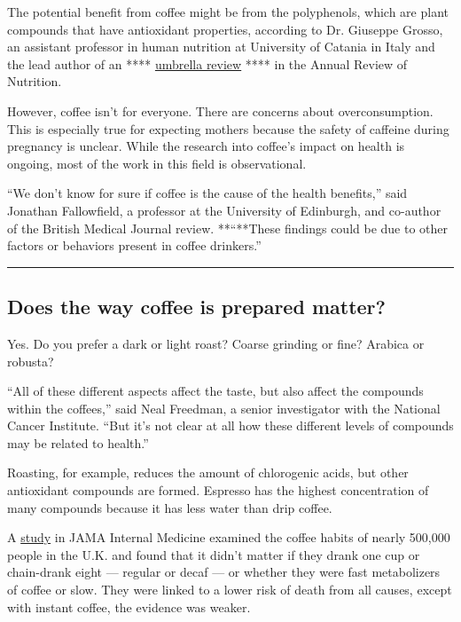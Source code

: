 The potential benefit from coffee might be from the polyphenols, which
are plant compounds that have antioxidant properties, according to Dr.
Giuseppe Grosso, an assistant professor in human nutrition at University
of Catania in Italy and the lead author of an ****
\href{https://www.annualreviews.org/doi/10.1146/annurev-nutr-071816-064941}{umbrella
review} **** in the Annual Review of Nutrition.

However, coffee isn't for everyone. There are concerns about
overconsumption. This is especially true for expecting mothers because
the safety of caffeine during pregnancy is unclear. While the research
into coffee's impact on health is ongoing, most of the work in this
field is observational.

``We don't know for sure if coffee is the cause of the health
benefits,'' said Jonathan Fallowfield, a professor at the University of
Edinburgh, and co-author of the British Medical Journal review.
**``**These findings could be due to other factors or behaviors present
in coffee drinkers.''

\begin{center}\rule{0.5\linewidth}{\linethickness}\end{center}

\hypertarget{does-the-way-coffee-is-prepared-matter}{%
\subsection{Does the way coffee is prepared
matter?}\label{does-the-way-coffee-is-prepared-matter}}

Yes. Do you prefer a dark or light roast? Coarse grinding or fine?
Arabica or robusta?

``All of these different aspects affect the taste, but also affect the
compounds within the coffees,'' said Neal Freedman, a senior
investigator with the National Cancer Institute. ``But it's not clear at
all how these different levels of compounds may be related to health.''

Roasting, for example, reduces the amount of chlorogenic acids, but
other antioxidant compounds are formed. Espresso has the highest
concentration of many compounds because it has less water than drip
coffee.

A
\href{https://jamanetwork.com/journals/jamainternalmedicine/fullarticle/2686145}{study}
in JAMA Internal Medicine examined the coffee habits of nearly 500,000
people in the U.K. and found that it didn't matter if they drank one cup
or chain-drank eight --- regular or decaf --- or whether they were fast
metabolizers of coffee or slow. They were linked to a lower risk of
death from all causes, except with instant coffee, the evidence was
weaker.

